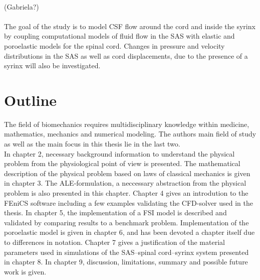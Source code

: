 \\
(Gabriela?)
\\
\\
The goal of the study is to model CSF flow around the cord and inside the syrinx by coupling computational models of fluid flow in the SAS with elastic and poroelastic models for the spinal cord. Changes in pressure and velocity distributions in the SAS as well as cord displacements, due to the presence of a syrinx will also be investigated. 
\section{Outline}
The field of biomechanics requires multidisciplinary knowledge within medicine, mathematics, mechanics and numerical modeling. The authors main field of study as well as the main focus in this thesis lie in the last two. 
\\
In chapter 2, necessary background information to understand the physical problem from the physiological point of view is presented. The mathematical description of the physical problem based on laws of classical mechanics is given in chapter 3. The ALE-formulation, a neccessary abstraction from the physical problem is also presented in this chapter. Chapter 4 gives an introdution to the FEniCS software including a few examples validating the CFD-solver used in the thesis. In chapter 5, the implementation of a FSI model is described and validated by comparing results to a benchmark problem. Implementation of the poroelastic model is given in chapter 6, and has been devoted a chapter itself due to differences in notation. Chapter 7 gives a justification of the material parameters used in simulations of the SAS--spinal cord--syrinx system presented in chapter 8. In chapter 9, discussion, limitations, summary and possible future work is given. 
